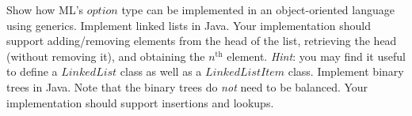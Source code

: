 \documentclass[10pt,a4paper,fleqn]{exam}
\begin{document}
\begin{questions}
\question Show how ML's $\mathit{option}$ type can be implemented in an object-oriented language using generics.
\question Implement linked lists in Java. Your implementation should support adding/removing elements from the head of the list, retrieving the head (without removing it), and obtaining the $n^{\text{th}}$ element. \emph{Hint}: you may find it useful to define a $\mathit{LinkedList}$ class as well as a $\mathit{LinkedListItem}$ class.
\question Implement binary trees in Java. Note that the binary trees do \emph{not} need to be balanced. Your implementation should support insertions and lookups. 

\end{questions}
\end{document}

